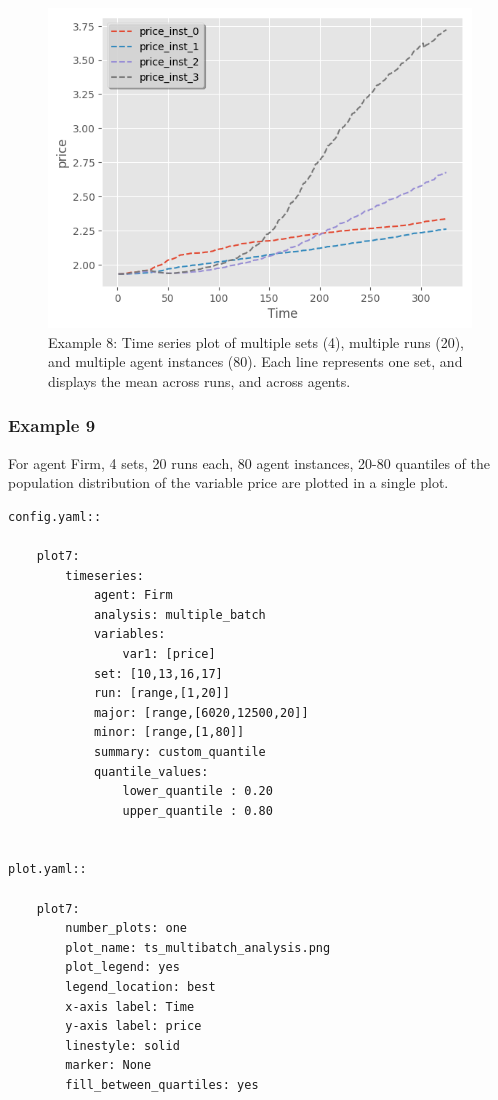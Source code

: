 \documentclass[10pt,a4paper]{article}
\begin{document}
\begin{figure}[b!]\centering\leavevmode
\includegraphics[scale=.6]{./plots_tut_2/P4_ts_price.png}
\caption{\footnotesize  Example 8: Time series plot of multiple sets (4), multiple runs (20), and multiple agent instances (80). Each line represents one set, and displays the mean across runs, and across agents.}
\end{figure}



\clearpage
\subsubsection{Example 9}
For agent Firm, 4 sets, 20 runs each, 80 agent instances, 20-80 quantiles of the population distribution of the variable price are plotted in a single plot.

\begin{lstlisting}
config.yaml::

    plot7:
        timeseries:
            agent: Firm
            analysis: multiple_batch
            variables:
                var1: [price]
            set: [10,13,16,17]
            run: [range,[1,20]]
            major: [range,[6020,12500,20]]
            minor: [range,[1,80]] 
            summary: custom_quantile
            quantile_values:          
                lower_quantile : 0.20
                upper_quantile : 0.80


plot.yaml::

    plot7:
        number_plots: one
        plot_name: ts_multibatch_analysis.png
        plot_legend: yes
        legend_location: best
        x-axis label: Time
        y-axis label: price
        linestyle: solid
        marker: None
        fill_between_quartiles: yes
\end{lstlisting}
\end{document}
